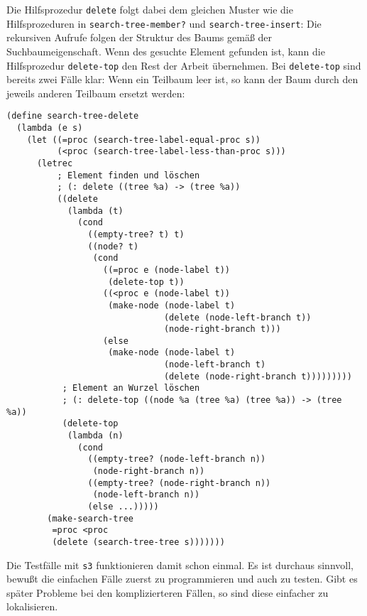 %
Die Hilfsprozedur \texttt{delete} folgt dabei dem gleichen Muster wie
die Hilfsprozeduren in \texttt{search-tree-member?} und
\texttt{search-tree-insert}: Die rekursiven Aufrufe folgen der
Struktur des Baums gemäß der Suchbaumeigenschaft.  Wenn des gesuchte
Element gefunden ist, kann die Hilfsprozedur \texttt{delete-top} den
Rest der Arbeit übernehmen.  Bei \texttt{delete-top} sind bereits zwei
Fälle klar: Wenn ein Teilbaum leer ist, so kann der Baum durch den
jeweils anderen Teilbaum ersetzt werden:
%
\begin{verbatim}
(define search-tree-delete
  (lambda (e s)
    (let ((=proc (search-tree-label-equal-proc s))
          (<proc (search-tree-label-less-than-proc s)))
      (letrec
          ; Element finden und löschen
          ; (: delete ((tree %a) -> (tree %a))
          ((delete
            (lambda (t)
              (cond
                ((empty-tree? t) t)
                ((node? t)
                 (cond
                   ((=proc e (node-label t))
                    (delete-top t))
                   ((<proc e (node-label t))
                    (make-node (node-label t)
                               (delete (node-left-branch t))
                               (node-right-branch t)))
                   (else
                    (make-node (node-label t)
                               (node-left-branch t)
                               (delete (node-right-branch t)))))))))
           ; Element an Wurzel löschen
           ; (: delete-top ((node %a (tree %a) (tree %a)) -> (tree %a))
           (delete-top
            (lambda (n)
              (cond
                ((empty-tree? (node-left-branch n))
                 (node-right-branch n))
                ((empty-tree? (node-right-branch n))
                 (node-left-branch n))
                (else ...)))))
        (make-search-tree
         =proc <proc
         (delete (search-tree-tree s)))))))
\end{verbatim}
%
Die Testfälle mit \texttt{s3} funktionieren damit schon einmal.  Es
ist durchaus sinnvoll, bewußt die einfachen Fälle zuerst zu
programmieren und auch zu testen.  Gibt es später Probleme bei den
komplizierteren Fällen, so sind diese einfacher zu lokalisieren.


